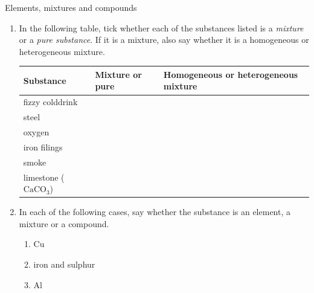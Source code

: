             \begin{exercises}{Elements, mixtures and compounds}{
            \nopagebreak
            \label{m38708*id63472}
 \begin{enumerate}[noitemsep, label=\textbf{\arabic*}. ] 
            \label{m38708*uid28}
    \item In the following table, tick whether each of the substances listed is a \textsl{mixture} or a \textsl{pure substance}. If it is a mixture, also say whether it is a homogeneous or heterogeneous mixture.
          \begin{table}[H]
        \begin{center}
      \label{m38708*id63499}
    \noindent
      \begin{tabular}{|l|l|l|}\hline
        \textbf{Substance} &
        \textbf{Mixture or pure} &
        \textbf{Homogeneous or heterogeneous mixture} \\ \hline
        fizzy colddrink & & \\ \hline
        steel & & \\ \hline
        oxygen & & \\ \hline
        iron filings & & \\ \hline
        smoke & & \\ \hline
        limestone (${\text{CaCO}}_{3}$) & & \\ \hline
    \end{tabular}
      \end{center}
\end{table}
    \par
\label{m38708*uid29}\item In each of the following cases, say whether the substance is an element, a mixture or a compound.
\label{m38708*id63912}\begin{enumerate}[noitemsep, label=\textbf{\alph*}. ] 
            \label{m38708*uid30}\item $\text{Cu}$
\label{m38708*uid31}\item iron and sulphur
\label{m38708*uid32}\item $\text{Al}$

\end{enumerate}
\end{enumerate}}
\end{exercises}
